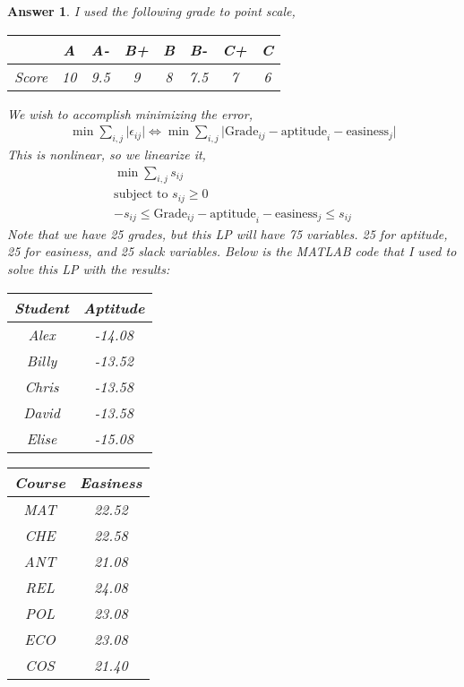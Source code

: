 \documentclass[12pt]{article}
\theoremstyle{colon}
\newtheorem*{answer}{Answer}
\begin{document}
\begin{answer}
  I used the following grade to point scale,
  \begin{center}
    \begin{tabular}{c | c c c c c c c}
      & A & A- & B+ & B & B- & C+ & C \\
      \hline
      Score & 10 & 9.5 & 9 & 8 & 7.5 & 7 & 6
    \end{tabular}
  \end{center}
  We wish to accomplish minimizing the error,
  \begin{gather*}
    \min \sum_{i,j} \lvert \epsilon_{ij} \rvert \Longleftrightarrow \min \sum_{i,j} \lvert \text{Grade}_{ij} - \text{aptitude}_i - \text{easiness}_j \rvert
  \end{gather*}
  This is nonlinear, so we linearize it,
  \begin{gather*}
    \min \sum_{i,j} s_{ij} \\
    \text{subject to } s_{ij} \geq 0 \\
    -s_{ij} \leq \text{Grade}_{ij} - \text{aptitude}_i - \text{easiness}_j \leq s_{ij}
  \end{gather*}
  Note that we have 25 grades, but this LP will have 75 variables. 25 for aptitude, 25 for easiness, and 25 slack variables. Below is the MATLAB code that I used to solve this LP with the results:
  \begin{center}
    \begin{tabular}{c | c}
      Student & Aptitude \\
      \hline
      Alex & -14.08 \\
      Billy & -13.52 \\
      Chris & -13.58 \\
      David & -13.58 \\
      Elise & -15.08
    \end{tabular}
    \begin{tabular}{c | c}
      Course & Easiness \\
      \hline
      MAT & 22.52 \\
      CHE & 22.58 \\
      ANT & 21.08 \\
      REL & 24.08 \\
      POL & 23.08 \\
      ECO & 23.08 \\
      COS & 21.40 \\
    \end{tabular}
  \end{center}


\end{answer}
\end{document}

